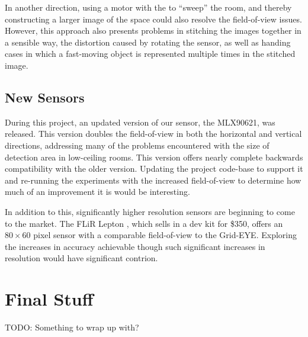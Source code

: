 \documentclass[../thesis/thesis.tex]{subfiles}
\begin{document}
In another direction, using a motor with the \mlx to ``sweep'' the room, and thereby constructing a larger image of the space could also resolve the field-of-view issues. However, this approach also presents problems in stitching the images together in a sensible way, the distortion caused by rotating the sensor, as well as handing cases in which a fast-moving object is represented multiple times in the stitched image.

\subsection{New Sensors}
During this project, an updated version of our sensor, the MLX90621, was released. This version doubles the field-of-view in both the horizontal and vertical directions, addressing many of the problems encountered with the size of detection area in low-ceiling rooms. This version offers nearly complete backwards compatibility with the older version. Updating the project code-base to support it and re-running the experiments with the increased field-of-view to determine how much of an improvement it is would be interesting.

In addition to this, significantly higher resolution sensors are beginning to come to the market. The FLiR Lepton \cite{flir}, which sells in a dev kit for \$350, offers an $80 \times 60$ pixel sensor with a comparable field-of-view to the Grid-EYE. Exploring the increases in accuracy achievable though such significant increases in resolution would have significant contrion.

\section{Final Stuff}
TODO: Something to wrap up with?
 
\end{document}
